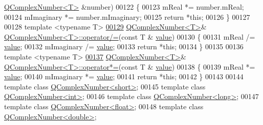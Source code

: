 \begin{DoxyCode}
      \hyperlink{a00021}{QComplexNumber<T>} &number)
00122 \{
00123     mReal *= number.mReal;
00124     mImaginary *= number.mImaginary;
00125     \textcolor{keywordflow}{return} *\textcolor{keyword}{this};
00126 \}
00127 
00128 \textcolor{keyword}{template} <\textcolor{keyword}{typename} T>
\hypertarget{a00113_source_l00129}{}\hyperlink{a00021_aae3b21024de823c87f04e5b86853ce45}{00129} \hyperlink{a00021}{QComplexNumber<T>}& \hyperlink{a00021_a070852367a712f7b9dd2dff0ee5c3439}{QComplexNumber<T>::operator/=}(\textcolor{keyword}{const} T &
      \hyperlink{a00116_aee90379adb0307effb138f4871edbc5c}{value})
00130 \{
00131     mReal /= \hyperlink{a00116_aee90379adb0307effb138f4871edbc5c}{value};
00132     mImaginary /= \hyperlink{a00116_aee90379adb0307effb138f4871edbc5c}{value};
00133     \textcolor{keywordflow}{return} *\textcolor{keyword}{this};
00134 \}
00135 
00136 \textcolor{keyword}{template} <\textcolor{keyword}{typename} T>
\hypertarget{a00113_source_l00137}{}\hyperlink{a00021_a128cc004798d636109125374e1549ae0}{00137} \hyperlink{a00021}{QComplexNumber<T>}& \hyperlink{a00021_a13c0aad5e700fe92eb9acf5fae669975}{QComplexNumber<T>::operator*=}(\textcolor{keyword}{const} T &
      \hyperlink{a00116_aee90379adb0307effb138f4871edbc5c}{value})
00138 \{
00139     mReal *= \hyperlink{a00116_aee90379adb0307effb138f4871edbc5c}{value};
00140     mImaginary *= \hyperlink{a00116_aee90379adb0307effb138f4871edbc5c}{value};
00141     \textcolor{keywordflow}{return} *\textcolor{keyword}{this};
00142 \}
00143 
00144 \textcolor{keyword}{template} \textcolor{keyword}{class }\hyperlink{a00021}{QComplexNumber<short>};
00145 \textcolor{keyword}{template} \textcolor{keyword}{class }\hyperlink{a00021}{QComplexNumber<int>};
00146 \textcolor{keyword}{template} \textcolor{keyword}{class }\hyperlink{a00021}{QComplexNumber<long>};
00147 \textcolor{keyword}{template} \textcolor{keyword}{class }\hyperlink{a00021}{QComplexNumber<float>};
00148 \textcolor{keyword}{template} \textcolor{keyword}{class }\hyperlink{a00021}{QComplexNumber<double>};
\end{DoxyCode}
